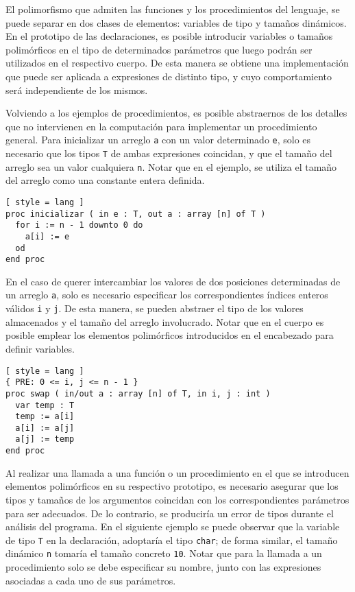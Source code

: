 El polimorfismo que admiten las funciones y los procedimientos del lenguaje, se puede separar en dos clases de elementos: variables de tipo y tamaños dinámicos.
En el prototipo de las declaraciones, es posible introducir variables o tamaños polimórficos en el tipo de determinados parámetros que luego podrán ser utilizados en el respectivo cuerpo.
De esta manera se obtiene una implementación que puede ser aplicada a expresiones de distinto tipo, y cuyo comportamiento será independiente de los mismos.

Volviendo a los ejemplos de procedimientos, es posible abstraernos de los detalles que no intervienen en la computación para implementar un procedimiento general.
Para inicializar un arreglo \lstinline[style = lang]{a} con un valor determinado \lstinline[style = lang]{e}, solo es necesario que los tipos \lstinline[style = lang]{T} de ambas expresiones coincidan, y que el tamaño del arreglo sea un valor cualquiera \lstinline[style = lang]{n}.
Notar que en el ejemplo, se utiliza el tamaño del arreglo como una constante entera definida.

\begin{lstlisting}[ style = lang ]
proc inicializar ( in e : T, out a : array [n] of T )
  for i := n - 1 downto 0 do
    a[i] := e
  od
end proc
\end{lstlisting}

En el caso de querer intercambiar los valores de dos posiciones determinadas de un arreglo \lstinline[style = lang]{a}, solo es necesario especificar los correspondientes índices enteros válidos \lstinline[style = lang]{i} y \lstinline[style = lang]{j}.
De esta manera, se pueden abstraer el tipo de los valores almacenados y el tamaño del arreglo involucrado. 
Notar que en el cuerpo es posible emplear los elementos polimórficos introducidos en el encabezado para definir variables.

\begin{lstlisting}[ style = lang ]
{ PRE: 0 <= i, j <= n - 1 }
proc swap ( in/out a : array [n] of T, in i, j : int )
  var temp : T
  temp := a[i]
  a[i] := a[j]
  a[j] := temp
end proc
\end{lstlisting}

Al realizar una llamada a una función o un procedimiento en el que se introducen elementos polimórficos en su respectivo prototipo, es necesario asegurar que los tipos y tamaños de los argumentos coincidan con los correspondientes parámetros para ser adecuados.
De lo contrario, se produciría un error de tipos durante el análisis del programa.
En el siguiente ejemplo se puede observar que la variable de tipo \lstinline[style = lang]{T} en la declaración, adoptaría el tipo \lstinline[style = lang]{char}; de forma similar, el tamaño dinámico \lstinline[style = lang]{n} tomaría el tamaño concreto \lstinline[style = lang]{10}.
Notar que para la llamada a un procedimiento solo se debe especificar su nombre, junto con las expresiones asociadas a cada uno de sus parámetros.

